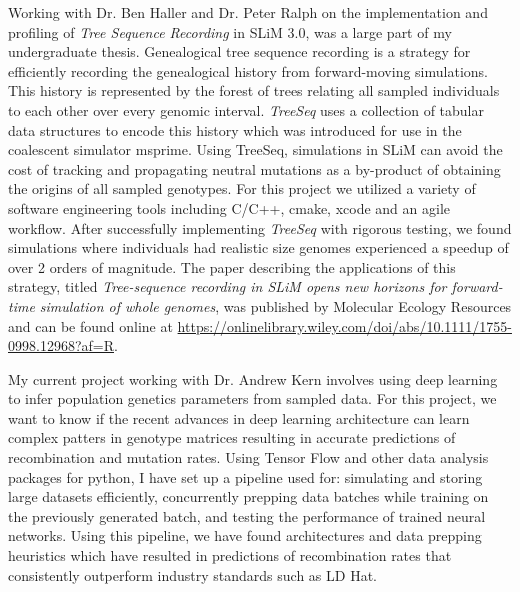 \documentclass[11pt]{amsart}
\newcommand{\sepspace}{\vspace*{1em}}		%
\begin{document}
Working with Dr. Ben Haller and Dr. Peter Ralph on the implementation and profiling  of \textit{Tree Sequence Recording} in SLiM 3.0, was a large part of my undergraduate thesis.
Genealogical tree sequence recording is a strategy for efficiently recording the genealogical history from forward-moving simulations. 
This history is represented by the forest of trees relating all sampled individuals to each other over every genomic interval. 
\textit{TreeSeq} uses a collection of tabular data structures to encode this history which was introduced for use in the coalescent simulator msprime. 
Using TreeSeq, simulations in SLiM can avoid the cost of tracking and propagating neutral mutations as a by-product of obtaining the origins of all sampled genotypes.
For this project we utilized a variety of software engineering tools including C/C++, cmake, xcode and an agile workflow.
After successfully implementing \textit{TreeSeq} with rigorous testing, we found simulations where individuals had realistic size genomes experienced a speedup of over 2 orders of magnitude. 
The paper describing the applications of this strategy, titled \textit{Tree-sequence recording in SLiM opens new horizons for forward-time simulation of whole genomes}, was published by Molecular Ecology Resources and can be found online at 
\url{https://onlinelibrary.wiley.com/doi/abs/10.1111/1755-0998.12968?af=R}.
\sepspace

My current project working with Dr. Andrew Kern involves using deep learning to infer population genetics parameters from sampled data. 
For this project, we want to know if the recent advances in deep learning architecture can learn complex patters in genotype matrices resulting in accurate predictions of recombination and mutation rates. 
Using Tensor Flow and other data analysis packages for python, I have set up a pipeline used for: 
simulating and storing large datasets efficiently, 
concurrently prepping data batches while training on the previously generated batch, 
and testing the performance of trained neural networks.
Using this pipeline, we have found architectures and data prepping heuristics which have resulted in predictions of recombination rates that consistently outperform industry standards such as LD Hat. 
\sepspace
\end{document}
